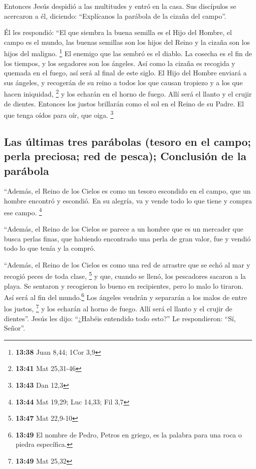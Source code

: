  Entonces Jesús despidió a las multitudes y entró en la
casa. Sus discípulos se acercaron a él, diciendo: ``Explícanos la
parábola de la cizaña del campo''.

 Él les respondió: ``El que siembra la buena semilla es
el Hijo del Hombre,  el campo es el mundo, las buenas
semillas son los hijos del Reino y la cizaña son los hijos del maligno.
\footnote{\textbf{13:38} Juan 8,44; 1Cor 3,9}  El enemigo
que las sembró es el diablo. La cosecha es el fin de los tiempos, y los
segadores son los ángeles.  Así como la cizaña es
recogida y quemada en el fuego, así será al final de este siglo.
 El Hijo del Hombre enviará a sus ángeles, y recogerán de
su reino a todos los que causan tropiezo y a los que hacen iniquidad,
\footnote{\textbf{13:41} Mat 25,31-46}  y los echarán en
el horno de fuego. Allí será el llanto y el crujir de dientes.
 Entonces los justos brillarán como el sol en el Reino de
su Padre. El que tenga oídos para oír, que oiga. \footnote{\textbf{13:43}
  Dan 12,3}

\hypertarget{las-uxfaltimas-tres-paruxe1bolas-tesoro-en-el-campo-perla-preciosa-red-de-pesca-conclusiuxf3n-de-la-paruxe1bola}{%
\subsection{Las últimas tres parábolas (tesoro en el campo; perla
preciosa; red de pesca); Conclusión de la
parábola}\label{las-uxfaltimas-tres-paruxe1bolas-tesoro-en-el-campo-perla-preciosa-red-de-pesca-conclusiuxf3n-de-la-paruxe1bola}}

 ``Además, el Reino de los Cielos es como un tesoro
escondido en el campo, que un hombre encontró y escondió. En su alegría,
va y vende todo lo que tiene y compra ese campo. \footnote{\textbf{13:44}
  Mat 19,29; Luc 14,33; Fil 3,7}

 ``Además, el Reino de los Cielos se parece a un hombre
que es un mercader que busca perlas finas,  que habiendo
encontrado una perla de gran valor, fue y vendió todo lo que tenía y la
compró.

 ``Además, el Reino de los Cielos es como una red de
arrastre que se echó al mar y recogió peces de toda clase, \footnote{\textbf{13:47}
  Mat 22,9-10}  y que, cuando se llenó, los pescadores
sacaron a la playa. Se sentaron y recogieron lo bueno en recipientes,
pero lo malo lo tiraron.  Así será al fin del
mundo.\footnote{\textbf{13:49} El nombre de Pedro, Petros en griego, es
  la palabra para una roca o piedra específica.} Los ángeles vendrán y
separarán a los malos de entre los justos, \footnote{\textbf{13:49} Mat
  25,32}  y los echarán al horno de fuego. Allí será el
llanto y el crujir de dientes''.  Jesús les dijo:
``¿Habéis entendido todo esto?'' Le respondieron: ``Sí, Señor''.

